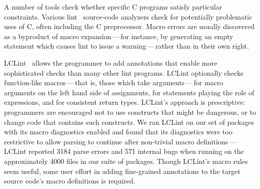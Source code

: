 \documentclass[10pt]{article}
\begin{document}

A number of tools check whether specific C programs satisfy particular
constraints.  Various lint~\cite{Johnson77} source-code analyzers check
for potentially problematic uses of C, often including the C preprocessor.
Macro errors are usually discovered as a byproduct of macro
expansion\,---\,for instance, by generating an empty statement which causes
lint to issue a warning\,---\,rather than in their own right.

LCLint~\cite{Evans-fse94,Evans:LCLint} allows the programmer to add
annotations that enable more sophisticated checks than many other lint
programs.  LCLint optionally checks function-like macros\,---\,that is,
those which take arguments\,---\,for macro arguments on the left hand
side of assignments, for statements playing the role of expressions, and
for consistent return types.  LCLint's approach is prescriptive:
programmers are encouraged not to use constructs that might be
dangerous, or to change code that contains such constructs.  We ran
LCLint on our set of packages with its macro diagnostics enabled and
found that its diagnostics were too restrictive to allow parsing to
continue after non-trivial macro definitions\,---\,LCLint reported 3184
parse errors and 571 internal bugs when running on the approximately
4000 files in our suite of packages.  Though LCLint's macro rules seem
useful, some user effort in adding fine-grained annotations to the
target source code's macro definitions is required.

\end{document}
